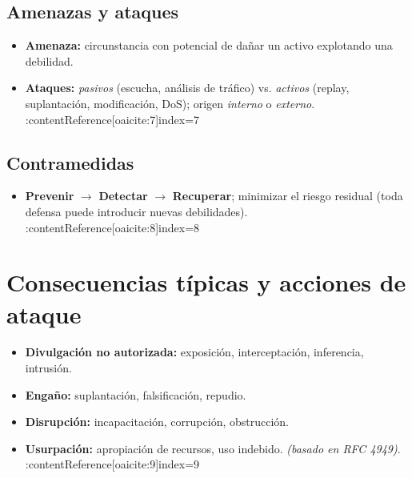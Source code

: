 \documentclass[11pt,a4paper]{article}
\begin{document}
    \subsection{Amenazas y ataques}
    \begin{itemize}
        \item \textbf{Amenaza:} circunstancia con potencial de dañar un activo explotando una debilidad.
        \item \textbf{Ataques:} \emph{pasivos} (escucha, análisis de tráfico) vs. \emph{activos} (replay, suplantación, modificación, DoS); origen \emph{interno} o \emph{externo}. :contentReference[oaicite:7]{index=7}
    \end{itemize}

    \subsection{Contramedidas}
    \begin{itemize}
        \item \textbf{Prevenir} \(\rightarrow\) \textbf{Detectar} \(\rightarrow\) \textbf{Recuperar}; minimizar el riesgo residual (toda defensa puede introducir nuevas debilidades). :contentReference[oaicite:8]{index=8}
    \end{itemize}

    \section{Consecuencias típicas y acciones de ataque}
    \begin{itemize}
        \item \textbf{Divulgación no autorizada:} exposición, interceptación, inferencia, intrusión.
        \item \textbf{Engaño:} suplantación, falsificación, repudio.
        \item \textbf{Disrupción:} incapacitación, corrupción, obstrucción.
        \item \textbf{Usurpación:} apropiación de recursos, uso indebido. \textit{(basado en RFC 4949)}. :contentReference[oaicite:9]{index=9}
    \end{itemize}
\end{document}
